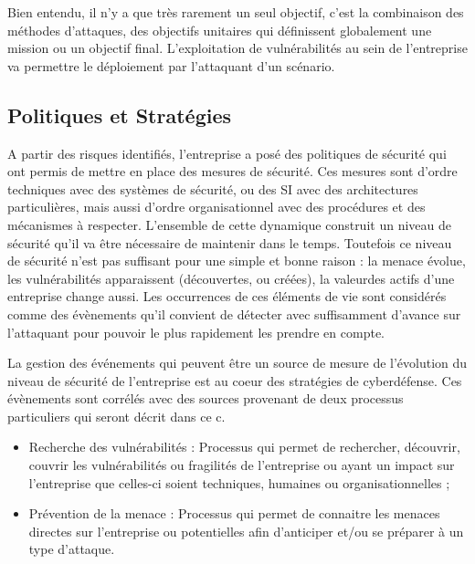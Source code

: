Bien entendu, il n’y a que très rarement un seul objectif, c’est la combinaison des méthodes d’attaques, des objectifs unitaires qui définissent globalement une mission ou un objectif final. L’exploitation de vulnérabilités au sein de l’entreprise va permettre le déploiement par l’attaquant d’un scénario.

\subsection{Politiques et Stratégies}


A partir des risques identifiés, l’entreprise a posé des politiques de sécurité qui ont permis de mettre en place des mesures de sécurité. Ces mesures sont d’ordre techniques avec des systèmes de sécurité, ou des SI avec des architectures particulières, mais aussi d’ordre organisationnel avec des procédures et des mécanismes à respecter.
L’ensemble de cette dynamique construit un niveau de sécurité qu’il va être nécessaire de maintenir dans le temps. Toutefois ce niveau de sécurité n’est pas suffisant pour une simple et bonne raison :  la menace évolue, les vulnérabilités apparaissent (découvertes, ou créées), la valeurdes actifs d’une entreprise change aussi. 
Les occurrences de ces éléments de vie sont considérés comme des évènements qu’il convient de détecter avec suffisamment d’avance sur l’attaquant pour pouvoir le plus rapidement les prendre en compte.



La gestion des événements qui peuvent être un source de mesure de l’évolution du niveau de sécurité de l’entreprise est au coeur des stratégies de cyberdéfense. Ces évènements sont corrélés avec des sources provenant de deux processus particuliers qui seront décrit dans ce c\edoc.

\begin{itemize}
\item  Recherche des vulnérabilités  : Processus qui permet de rechercher, découvrir, couvrir  les vulnérabilités ou fragilités de l’entreprise ou ayant un impact sur l’entreprise que celles-ci soient techniques, humaines ou organisationnelles ;
\item  Prévention de la menace : Processus qui permet de connaitre les menaces directes sur l’entreprise ou potentielles afin d’anticiper et/ou se préparer à un type d’attaque.
\end{itemize}


